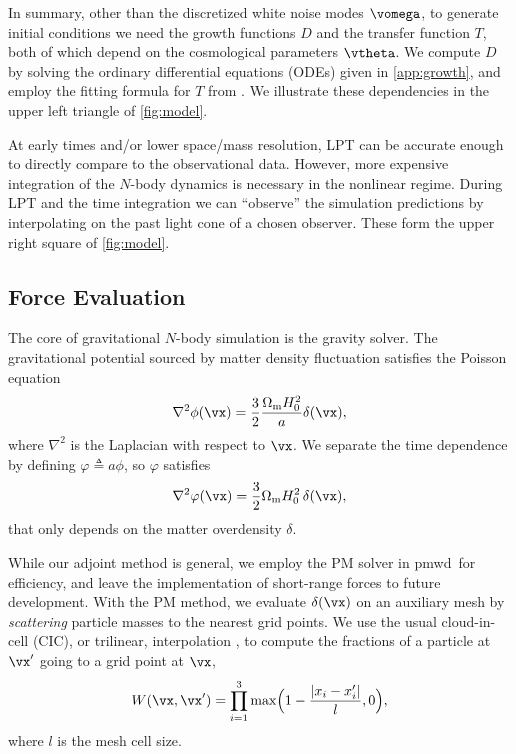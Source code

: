 \documentclass[modern, dvipsnames]{aastex631}
\newcommand{\pmwd}{{\usefont{T1}{nova}{m}{sl}pmwd}}
\newcommand{\Omegam}{\Omega_\mathrm{m}}
\begin{document}
In summary, other than the discretized white noise modes $\vomega$, to
generate initial conditions we need the growth functions $D$ and the
transfer function $T$, both of which depend on the cosmological
parameters $\vtheta$.
We compute $D$ by solving the ordinary differential equations (ODEs)
given in \autoref{app:growth}, and employ the fitting formula for $T$
from \citet{EisensteinHu1998}.
We illustrate these dependencies in the upper left triangle of
\autoref{fig:model}.

At early times and/or lower space/mass resolution, LPT can be accurate
enough to directly compare to the observational data.
However, more expensive integration of the $N$-body dynamics is
necessary in the nonlinear regime.
During LPT and the time integration we can ``observe'' the simulation
predictions by interpolating on the past light cone of a chosen
observer.
These form the upper right square of \autoref{fig:model}.


\vspace{1em}
\subsection{Force Evaluation}
\label{sec:force}

The core of gravitational $N$-body simulation is the gravity solver.
The gravitational potential sourced by matter density fluctuation
satisfies the Poisson equation
%
\begin{equation}
\nabla^2 \phi(\vx) = \frac32 \frac{\Omegam H_0^2}{a} \delta(\vx),
\end{equation}
%
where $\nabla^2$ is the Laplacian with respect to $\vx$.
We separate the time dependence by defining $\varphi \triangleq a \phi$,
so $\varphi$ satisfies
%
\begin{equation}
\nabla^2 \varphi(\vx) = \frac32 \Omegam H_0^2 \, \delta(\vx),
\end{equation}
%
that only depends on the matter overdensity $\delta$.

While our adjoint method is general, we employ the PM solver in \pmwd\
for efficiency, and leave the implementation of short-range forces to
future development.
With the PM method, we evaluate $\delta(\vx)$ on an auxiliary mesh by
\emph{scattering} particle masses to the nearest grid points.
We use the usual cloud-in-cell (CIC), or trilinear, interpolation
\citep{HockneyEastwood1988}, to compute the fractions of a particle at
$\vx'$ going to a grid point at $\vx$,
%
\begin{equation}
W(\vx, \vx') = \prod_{i=1}^3
  \max \Bigl( 1 - \frac{|x_i-x'_i|}{l}, 0 \Bigr),
\label{cic}
\end{equation}
%
where $l$ is the mesh cell size.
\end{document}
